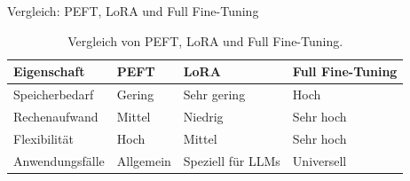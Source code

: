 \documentclass[aspectratio=1610, xcolor=dvipsnames, 9pt]{beamer}
\begin{document}
\begin{frame}{Vergleich: PEFT, LoRA und Full Fine-Tuning}
  \begin{table}[]
    \centering
    \begin{tabular}{|l|l|l|l|}
      \hline
      \textbf{Eigenschaft} & \textbf{PEFT} & \textbf{LoRA} & \textbf{Full Fine-Tuning} \\ \hline
      Speicherbedarf & Gering & Sehr gering & Hoch \\ \hline
      Rechenaufwand & Mittel & Niedrig & Sehr hoch \\ \hline
      Flexibilität & Hoch & Mittel & Sehr hoch \\ \hline
      Anwendungsfälle & Allgemein & Speziell für LLMs & Universell \\ \hline
    \end{tabular}
    \caption{Vergleich von PEFT, LoRA und Full Fine-Tuning.}
  \end{table}
\end{frame}
\end{document}
